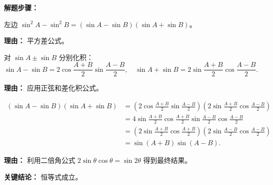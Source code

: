\begin{examplebox}
	\textbf{\textcolor{CExample}{解题步骤：}}
	\begin{description}[style=nextline, leftmargin=2.8em, labelsep=0.5em, itemsep=0.45em]
		\item[\textbf{第一步（平方差分解）：}] 左边 $\sin^2 A-\sin^2 B = (\sin A-\sin B)(\sin A+\sin B)$。
			\par\textbf{理由：} 平方差公式。
		\item[\textbf{第二步（和差化积）：}] 对 $\sin A\pm\sin B$ 分别化积：
			\[
				\sin A-\sin B = 2\cos\frac{A+B}{2}\sin\frac{A-B}{2},\quad
				\sin A+\sin B = 2\sin\frac{A+B}{2}\cos\frac{A-B}{2}.
			\]
			\par\textbf{理由：} 应用正弦和差化积公式。
		\item[\textbf{第三步（合并化简）：}]
			\[
				\begin{aligned}
					(\sin A-\sin B)(\sin A+\sin B)
					&= \left(2\cos\frac{A+B}{2}\sin\frac{A-B}{2}\right)\left(2\sin\frac{A+B}{2}\cos\frac{A-B}{2}\right) \\
					&= 4\sin\frac{A+B}{2}\cos\frac{A+B}{2}\sin\frac{A-B}{2}\cos\frac{A-B}{2} \\
					&= \left(2\sin\frac{A+B}{2}\cos\frac{A+B}{2}\right)\left(2\sin\frac{A-B}{2}\cos\frac{A-B}{2}\right) \\
					&= \sin(A+B)\sin(A-B).
			\end{aligned}
			\]
			\par\textbf{理由：} 利用二倍角公式 $2\sin\theta\cos\theta = \sin2\theta$ 得到最终结果。
	\end{description}

	\textbf{\textcolor{CExample}{关键结论：}}
	恒等式成立。
\end{examplebox}
